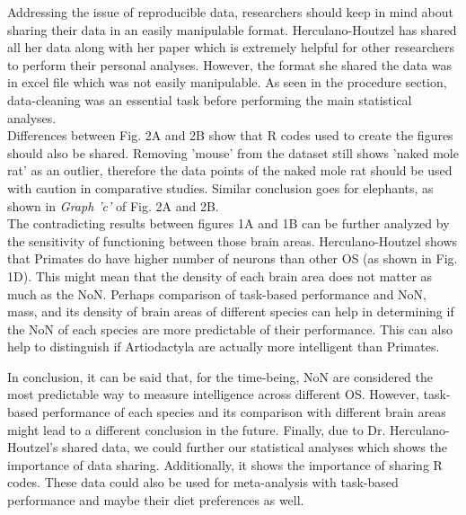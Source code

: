 \documentclass[landscape,final,paperwidth=48in,paperheight=48in,fontscale=0.285]{baposter}
\begin{document}
\begin{poster}
    {
       \smaller Addressing the issue of reproducible data, researchers should keep in mind about sharing their data in an easily manipulable format. Herculano-Houtzel has shared all her data along with her paper which is extremely helpful for other researchers to perform their personal analyses. However, the format she shared the data was in excel file which was not easily manipulable. As seen in the procedure section, data-cleaning was an essential task before performing the main statistical analyses. \\
       \indent Differences between Fig. 2A and 2B show that R codes used to create the figures should also be shared. Removing 'mouse' from the dataset still shows 'naked mole rat' as an outlier, therefore the data points of the naked mole rat should be used with caution in comparative studies. Similar conclusion goes for elephants, as shown in \textit{Graph 'c'} of Fig. 2A and 2B. \\
       \indent The contradicting results between figures 1A and 1B can be further analyzed by the sensitivity of functioning between those brain areas. Herculano-Houtzel shows that Primates do have higher number of neurons than other OS (as shown in Fig. 1D). This might mean that the density of each brain area does not matter as much as the NoN. Perhaps comparison of task-based performance and NoN, mass, and its density of brain areas of different species can help in determining if the NoN of each species are more predictable of their performance. This can also help to distinguish if Artiodactyla are actually more intelligent than Primates.
     }

{
\smaller In conclusion, it can be said that, for the time-being, NoN are considered the most predictable way to measure intelligence across different OS. However, task-based performance of each species and its comparison with different brain areas might lead to a different conclusion in the future. Finally, due to Dr. Herculano-Houtzel's shared data, we could further our statistical analyses which shows the importance of data sharing. Additionally, it shows the importance of sharing R codes. These data could also be used for meta-analysis with task-based performance and maybe their diet preferences as well.
}
  {
  \tiny
          \renewcommand{\refname}{\vspace{-0.5em}} %
          
          
}
\end{poster}
\end{document}
